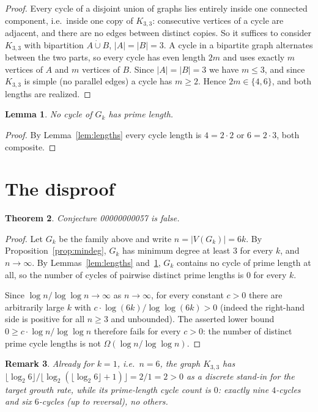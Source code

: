 \documentclass[11pt]{article}
\newtheorem{theorem}{Theorem}
\newtheorem{lemma}[theorem]{Lemma}
\newtheorem{remark}[theorem]{Remark}
\begin{document}
\begin{proof}
Every cycle of a disjoint union of graphs lies entirely inside one connected
component, i.e.\ inside one copy of $K_{3,3}$: consecutive vertices of a cycle
are adjacent, and there are no edges between distinct copies. So it suffices to
consider $K_{3,3}$ with bipartition $A \mathbin{\dot\cup} B$, $|A| = |B| = 3$.
A cycle in a bipartite graph alternates between the two parts, so every cycle
has even length $2m$ and uses exactly $m$ vertices of $A$ and $m$ vertices of
$B$. Since $|A| = |B| = 3$ we have $m \le 3$, and since $K_{3,3}$ is simple
(no parallel edges) a cycle has $m \ge 2$. Hence $2m \in \{4, 6\}$, and both
lengths are realized.
\end{proof}

\begin{lemma}\label{lem:noprime}
No cycle of $G_k$ has prime length.
\end{lemma}

\begin{proof}
By Lemma~\ref{lem:lengths} every cycle length is $4 = 2 \cdot 2$ or
$6 = 2 \cdot 3$, both composite.
\end{proof}

\section{The disproof}

\begin{theorem}
Conjecture 00000000057 is false.
\end{theorem}

\begin{proof}
Let $G_k$ be the family above and write $n = |V(G_k)| = 6k$. By
Proposition~\ref{prop:mindeg}, $G_k$ has minimum degree at least $3$ for every
$k$, and $n \to \infty$. By Lemmas~\ref{lem:lengths} and~\ref{lem:noprime},
$G_k$ contains no cycle of prime length at all, so the number of cycles of
pairwise distinct prime lengths is $0$ for every $k$.

Since $\log n / \log\log n \to \infty$ as $n \to \infty$, for every constant
$c > 0$ there are arbitrarily large $k$ with $c \cdot \log(6k) / \log\log(6k) > 0$
(indeed the right-hand side is positive for all $n \ge 3$ and unbounded).
The asserted lower bound $0 \ge c \cdot \log n / \log\log n$ therefore fails
for every $c > 0$: the number of distinct prime cycle lengths is not
$\Omega(\log n / \log\log n)$.
\end{proof}

\begin{remark}
Already for $k = 1$, i.e.\ $n = 6$, the graph $K_{3,3}$ has
$\lfloor \log_2 6 \rfloor / \lfloor \log_2 (\lfloor \log_2 6 \rfloor + 1) \rfloor
= 2 / 1 = 2 > 0$ as a discrete stand-in for the target growth rate, while its
prime-length cycle count is $0$: exactly nine $4$-cycles and six $6$-cycles
(up to reversal), no others.
\end{remark}
\end{document}
